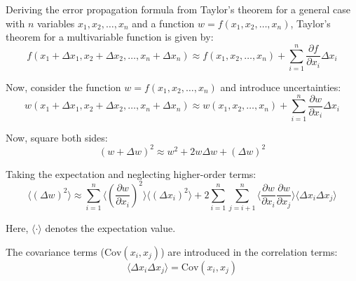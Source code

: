 \documentclass{article}
\begin{document}


Deriving the error propagation formula from Taylor's theorem for a general case with \( n \) variables \( x_1, x_2, \ldots, x_n \) and a function \( w = f(x_1, x_2, \ldots, x_n) \), Taylor's theorem for a multivariable function is given by\cite{taylor2022introduction,LUO201723}:
\begin{equation}
f(x_1 + \Delta x_1, x_2 + \Delta x_2, \ldots, x_n + \Delta x_n) \approx f(x_1, x_2, \ldots, x_n) + \sum_{i=1}^{n} \frac{\partial f}{\partial x_i} \Delta x_i
\end{equation}

Now, consider the function \( w = f(x_1, x_2, \ldots, x_n) \) and introduce uncertainties:
\begin{equation}
w(x_1 + \Delta x_1, x_2 + \Delta x_2, \ldots, x_n + \Delta x_n) \approx w(x_1, x_2, \ldots, x_n) + \sum_{i=1}^{n} \frac{\partial w}{\partial x_i} \Delta x_i
\end{equation}

Now, square both sides:
\begin{equation}
(w + \Delta w)^2 \approx w^2 + 2w\Delta w + (\Delta w)^2
\end{equation}

Taking the expectation and neglecting higher-order terms:
\begin{equation}
\langle (\Delta w)^2 \rangle \approx \sum_{i=1}^{n} \langle \left(\frac{\partial w}{\partial x_i}\right)^2 \rangle \langle (\Delta x_i)^2 \rangle + 2 \sum_{i=1}^{n} \sum_{j=i+1}^{n} \langle \frac{\partial w}{\partial x_i} \frac{\partial w}{\partial x_j} \rangle \langle \Delta x_i \Delta x_j \rangle
\end{equation}

Here, \( \langle \cdot \rangle \) denotes the expectation value.

The covariance terms (\( \text{Cov}(x_i, x_j) \)) are introduced in the correlation terms:
\begin{equation}
\langle \Delta x_i \Delta x_j \rangle = \text{Cov}(x_i, x_j)
\end{equation}
\end{document}
